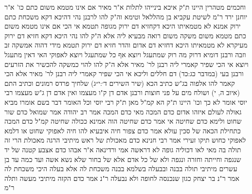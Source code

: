 \documentclass[12pt, openany]{book}
\begin{document}
{וחכמים מטהרין היינו ת"ק  איכא בינייהו לתלות
א"ר מאיר  אם אינו מטמא משום כתם כו'
א"ר יוחנן  ירד ר"מ לשיטת עקביא בן מהללאל וטימא  וה"ק להו לרבנן  נהי דהיכא דקא משכחת כתם ירוק אמנא לא מטמאיתו היכא דקחזיא דם ירוק מגופה תטמא 
אי הכי אם אינו מטמא משום כתם מטמא משום משקה משום רואה מבעיא ליה 
אלא ה"ק להו  נהי היכא דקא חזיא דם ירוק מעיקרא לא מטמאיתו היכא דחזיא דם אדום והדר חזיא דם ירוק תטמא מידי דהוה אמשקה זב וזבה 
ורבנן דומיא דרוק מה רוק שמתעגל ויוצא אף כל שמתעגל ויוצא לאפוקי האי דאין מתעגל ויוצא  אי הכי שפיר קאמרי ליה רבנן לר' מאיר 
אלא ה"ק להו  להוי כמשקה להכשיר את הזרעים  ורבנן בעי (במדבר כג:כד) דם חללים וליכא  אי הכי שפיר קאמרי ליה רבנן לר' מאיר 
אלא הכי קאמר להו אלפוה בג"ש כתיב הכא  (שיר השירים ד׳:י״ג) שלחיך פרדס רמונים וכתיב התם  (איוב ה, י) ושולח מים על פני חוצות 
ורבנן אדם דן ק"ו מעצמו ואין אדם דן ג"ש מעצמו
רבי יוסי אומר לא כך וכו' היינו ת"ק  הא קמ"ל  מאן ת"ק רבי יוסי וכל האומר דבר בשם אומרו מביא גאולה לעולם
איזהו אדום כדם המכה מאי כדם המכה  אמר רב יהודה אמר שמואל  כדם שור שחוט 
ולימא  כדם שחיטה  אי אמר כדם שחיטה הוה אמינא ככולה שחיטה קמ"ל כדם המכה כתחילת הכאה של סכין 
עולא אמר  כדם צפור חיה  איבעיא להו  חיה לאפוקי שחוט או דלמא לאפוקי כחוש  תיקו 
זעירי אמר רבי חנינא  כדם מאכולת של ראש  מיתיבי  הרגה מאכולת הרי זה תולה בה מאי לאו דכוליה גופה  לא דראשה 
אמי ורדינאה א"ר אבהו  כדם אצבע קטנה של יד שנגפה וחייתה וחזרה ונגפה ולא של כל אדם אלא של בחור שלא נשא אשה  ועד כמה  עד בן עשרים 
מיתיבי  תולה בבנה ובבעלה בשלמא בבנה משכחת לה אלא בעלה היכי משכחת לה 
אמר ר"נ בר יצחק  כגון שנכנסה לחופה ולא נבעלה 
ר"נ אמר  כדם הקזה  מיתיבי  מעשה ותלה ר"מ}
\end{document}
